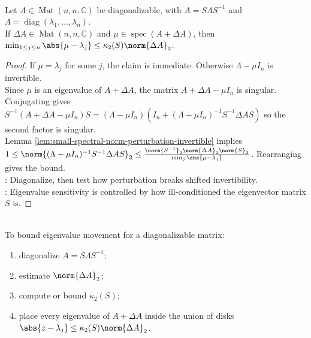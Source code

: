 \begin{theorem} \label{thm:bauer-fike-eigenvalue-perturbation} \\
Let $A\in\operatorname{Mat}(n,n,\mathbb{C})$ be diagonalizable, with $A=S\Lambda S^{-1}$ and $\Lambda=\operatorname{diag}(\lambda_1,\ldots,\lambda_n)$.\\
If $\Delta A\in\operatorname{Mat}(n,n,\mathbb{C})$ and $\mu\in\operatorname{spec}(A+\Delta A)$, then $\min_{1\leq j\leq n}\abs{\mu-\lambda_j} \leq \kappa_2(S)\norm{\Delta A}_2$.
\begin{proof}
If $\mu=\lambda_j$ for some $j$, the claim is immediate. Otherwise $\Lambda-\mu I_n$ is invertible.\\
Since $\mu$ is an eigenvalue of $A+\Delta A$, the matrix $A+\Delta A-\mu I_n$ is singular.\\
Conjugating gives $S^{-1}(A+\Delta A-\mu I_n)S =(\Lambda-\mu I_n)\left(I_n+(\Lambda-\mu I_n)^{-1}S^{-1}\Delta AS\right)$ so the second factor is singular.\\
Lemma \ref{lem:small-spectral-norm-perturbation-invertible} implies $1\leq \norm{(\Lambda-\mu I_n)^{-1}S^{-1}\Delta AS}_2 \leq \frac{\norm{S^{-1}}_2\norm{\Delta A}_2\norm{S}_2}{\min_j\abs{\mu-\lambda_j}}$.
Rearranging gives the bound.\\
: Diagonalize, then test how perturbation breaks shifted invertibility.\\
: Eigenvalue sensitivity is controlled by how ill-conditioned the eigenvector matrix $S$ is.
\end{proof}
\end{theorem}

\begin{method} \label{meth:bauer-fike-perturbation-method} \\
To bound eigenvalue movement for a diagonalizable matrix:
\begin{enumerate}[label=(\roman*)]
\setlength{\itemsep}{0pt}
\item diagonalize $A=S\Lambda S^{-1}$;
\item estimate $\norm{\Delta A}_2$;
\item compute or bound $\kappa_2(S)$;
\item place every eigenvalue of $A+\Delta A$ inside the union of disks $\abs{z-\lambda_j}\leq\kappa_2(S)\norm{\Delta A}_2$.
\end{enumerate}
\end{method}

